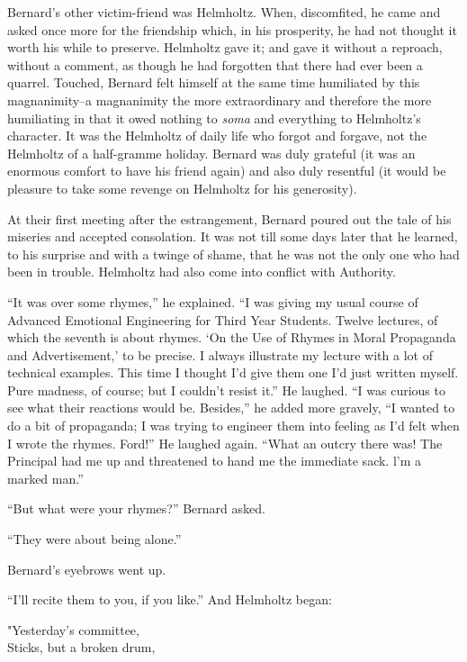\documentclass[12pt]{report}
\begin{document}
Bernard's other victim-friend was Helmholtz. When, discomfited, he came
and asked once more for the friendship which, in his prosperity, he had
not thought it worth his while to preserve. Helmholtz gave it; and gave
it without a reproach, without a comment, as though he had forgotten
that there had ever been a quarrel. Touched, Bernard felt himself at the
same time humiliated by this magnanimity--a magnanimity the more
extraordinary and therefore the more humiliating in that it owed nothing
to \emph{soma} and everything to Helmholtz's character. It was the
Helmholtz of daily life who forgot and forgave, not the Helmholtz of a
half-gramme holiday. Bernard was duly grateful (it was an enormous
comfort to have his friend again) and also duly resentful (it would be
pleasure to take some revenge on Helmholtz for his generosity).

At their first meeting after the estrangement, Bernard poured out the
tale of his miseries and accepted consolation. It was not till some days
later that he learned, to his surprise and with a twinge of shame, that
he was not the only one who had been in trouble. Helmholtz had also come
into conflict with Authority.

``It was over some rhymes,'' he explained. ``I was giving my usual
course of Advanced Emotional Engineering for Third Year Students. Twelve
lectures, of which the seventh is about rhymes. `On the Use of Rhymes in
Moral Propaganda and Advertisement,' to be precise. I always illustrate
my lecture with a lot of technical examples. This time I thought I'd
give them one I'd just written myself. Pure madness, of course; but I
couldn't resist it.'' He laughed. ``I was curious to see what their
reactions would be. Besides,'' he added more gravely, ``I wanted to do a
bit of propaganda; I was trying to engineer them into feeling as I'd
felt when I wrote the rhymes. Ford!'' He laughed again. ``What an outcry
there was! The Principal had me up and threatened to hand me the
immediate sack. l'm a marked man.''

``But what were your rhymes?'' Bernard asked.

``They were about being alone.''

Bernard's eyebrows went up.

``I'll recite them to you, if you like.'' And Helmholtz began:

\emph{}

"Yesterday's committee,\\

Sticks, but a broken drum,\\
\end{document}
